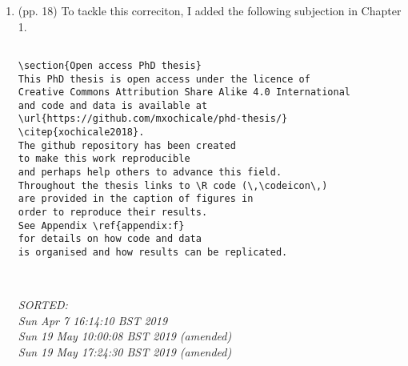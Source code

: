 \documentclass[12pt]{article}
\begin{document}
\begin{enumerate}

\item  (pp. 18)  To tackle this correciton, 
	I added the following subjection in Chapter 1. 

	\begin{verbatim}

\section{Open access PhD thesis}
This PhD thesis is open access under the licence of   
Creative Commons Attribution Share Alike 4.0 International 
and code and data is available at 
\url{https://github.com/mxochicale/phd-thesis/} \citep{xochicale2018}.
The github repository has been created 
to make this work reproducible 
and perhaps help others to advance this field.
Throughout the thesis links to \R code (\,\codeicon\,) 
are provided in the caption of figures in 
order to reproduce their results.
See Appendix \ref{appendix:f}
for details on how code and data 
is organised and how results can be replicated. 



	\end{verbatim}
	\textit{
	SORTED:  \\
	Sun Apr  7 16:14:10 BST 2019 \\
	Sun 19 May 10:00:08 BST 2019 (amended) \\
	Sun 19 May 17:24:30 BST 2019 (amended)
	}
	\\


\end{enumerate}




%
%
%
\end{document}
